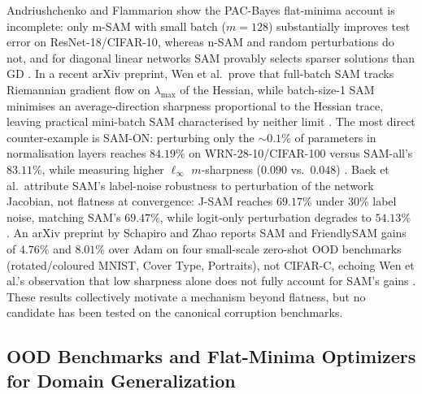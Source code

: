 Andriushchenko and Flammarion show the PAC-Bayes flat-minima account is incomplete: only m-SAM with small batch ($m=128$) substantially improves test error on ResNet-18/CIFAR-10, whereas n-SAM and random perturbations do not, and for diagonal linear networks SAM provably selects sparser solutions than GD \cite{andriushchenko2022_towards_understanding}.
In a recent arXiv preprint, Wen et al.\ prove that full-batch SAM tracks Riemannian gradient flow on $\lambda_{\max}$ of the Hessian, while batch-size-1 SAM minimises an average-direction sharpness proportional to the Hessian trace, leaving practical mini-batch SAM characterised by neither limit \cite{wen2022_how_does}.
The most direct counter-example is SAM-ON: perturbing only the $\sim\!0.1\%$ of parameters in normalisation layers reaches $84.19\%$ on WRN-28-10/CIFAR-100 versus SAM-all's $83.11\%$, while measuring higher $\ell_\infty$ $m$-sharpness ($0.090$ vs.\ $0.048$) \cite{mueller2023_normalization_layers}.
Baek et al.\ attribute SAM's label-noise robustness to perturbation of the network Jacobian, not flatness at convergence: J-SAM reaches $69.17\%$ under 30\% label noise, matching SAM's $69.47\%$, while logit-only perturbation degrades to $54.13\%$ \cite{baek2024_why_is}.
An arXiv preprint by Schapiro and Zhao reports SAM and FriendlySAM gains of $4.76\%$ and $8.01\%$ over Adam on four small-scale zero-shot OOD benchmarks (rotated/coloured MNIST, Cover Type, Portraits), not CIFAR-C, echoing Wen et al.'s observation that low sharpness alone does not fully account for SAM's gains \cite{schapiro2024_towards_understanding}.
These results collectively motivate a mechanism beyond flatness, but no candidate has been tested on the canonical corruption benchmarks.

\subsection{OOD Benchmarks and Flat-Minima Optimizers for Domain Generalization}

